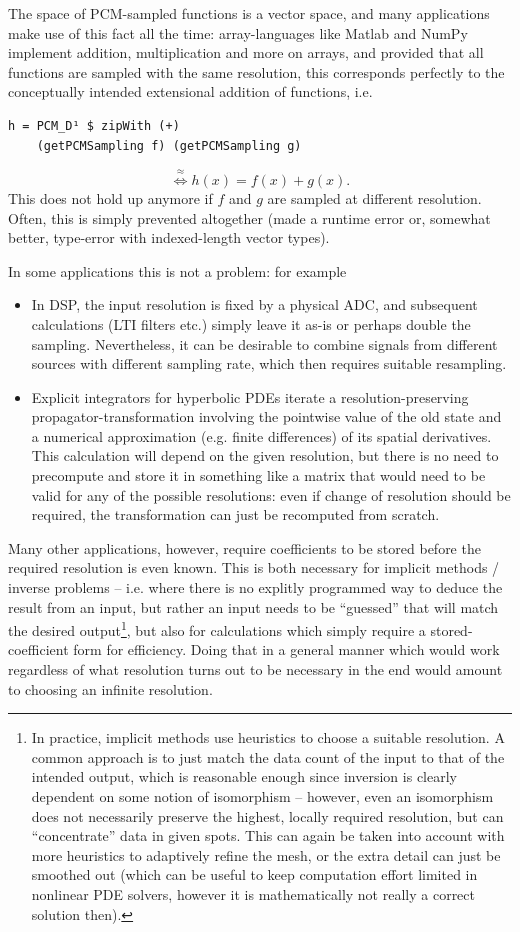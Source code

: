 \documentclass[final,sigplan]{acmart}\settopmatter{printfolios=true,printccs=false,printacmref=false}
\theoremstyle{acmplain}
\theoremstyle{acmdefinition}
\begin{document}
The space of PCM-sampled functions is a vector space, and many applications make use of this fact all the time: array-languages like Matlab and NumPy implement addition, multiplication and more on arrays, and provided that all functions are sampled with the same resolution, this corresponds perfectly to the conceptually intended extensional addition of functions, i.e.
\begin{lstlisting}
h = PCM_D¹ $ zipWith (+)
    (getPCMSampling f) (getPCMSampling g)
\end{lstlisting}
\[
  \stackrel{\approx}{\Leftrightarrow} h(x) = f(x) + g(x).
\]
This does not hold up anymore if $f$ and $g$ are sampled at different resolution. Often, this is simply prevented altogether (made a runtime error or, somewhat better, type-error with indexed-length vector types).

In some applications this is not a problem: for example
\begin{itemize}
 \item In DSP, the input resolution is fixed by a physical ADC, and subsequent calculations (LTI filters etc.) simply leave it as-is or perhaps double the sampling. Nevertheless, it can be desirable to combine signals from different sources with different sampling rate, which then requires suitable resampling.
 \item Explicit integrators for hyperbolic PDEs iterate a re\-so\-lu\-tion-pre\-ser\-ving pro\-pa\-ga\-tor-trans\-for\-ma\-tion in\-vol\-ving the pointwise value of the old state and a numerical approximation (e.g. finite differences) of its spatial derivatives. This calculation will depend on the given resolution, but there is no need to precompute and store it in something like a matrix that would need to be valid for any of the possible resolutions: even if change of resolution should be required, the transformation can just be recomputed from scratch.
\end{itemize}
Many other applications, however, require coefficients to be stored before the required resolution is even known.
This is both necessary for implicit methods / inverse problems -- i.e. where there is no explitly programmed way to deduce the result from an input, but rather an input needs to be “guessed” that will match the desired output\footnote{
In practice, implicit methods use heuristics to choose a suitable resolution. A common approach is to just match the data count of the input to that of the intended output, which is reasonable enough since inversion is clearly dependent on some notion of isomorphism -- however, even an isomorphism does not necessarily preserve the highest, locally required resolution, but can “concentrate” data in given spots. This can again be taken into account with more heuristics to adaptively refine the mesh, or the extra detail can just be smoothed out (which can be useful to keep computation effort limited in nonlinear PDE solvers, however it is mathematically not really a correct solution then).
}, but also for calculations which simply require a stored-coefficient form for efficiency. Doing that in a general manner which would work regardless of what resolution turns out to be necessary in the end would amount to choosing an infinite resolution.
\end{document}
